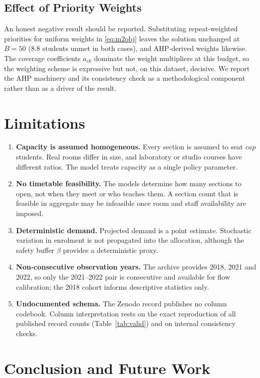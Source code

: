 \documentclass[conference]{IEEEtran}
\begin{document}
\subsection{Effect of Priority Weights}

An honest negative result should be reported. Substituting repeat-weighted priorities for
uniform weights in \eqref{eq:m2obj} leaves the solution unchanged at $B = 50$
(8.8 students unmet in both cases), and AHP-derived weights likewise. The coverage
coefficients $a_{ck}$ dominate the weight multipliers at this budget, so the weighting
scheme is expressive but not, on this dataset, decisive. We report the AHP machinery and
its consistency check as a methodological component rather than as a driver of the
result.

\section{Limitations}

\begin{enumerate}
\item \textbf{Capacity is assumed homogeneous.} Every section is assumed to seat $cap$
      students. Real rooms differ in size, and laboratory or studio courses have
      different ratios. The model treats capacity as a single policy parameter.
\item \textbf{No timetable feasibility.} The models determine how many sections to open,
      not when they meet or who teaches them. A section count that is feasible in
      aggregate may be infeasible once room and staff availability are imposed.
\item \textbf{Deterministic demand.} Projected demand is a point estimate. Stochastic
      variation in enrolment is not propagated into the allocation, although the safety
      buffer $\beta$ provides a deterministic proxy.
\item \textbf{Non-consecutive observation years.} The archive provides 2018, 2021 and
      2022, so only the 2021--2022 pair is consecutive and available for flow
      calibration; the 2018 cohort informs descriptive statistics only.
\item \textbf{Undocumented schema.} The Zenodo record publishes no column codebook.
      Column interpretation rests on the exact reproduction of all published record
      counts (Table~\ref{tab:valid}) and on internal consistency checks.
\end{enumerate}

\section{Conclusion and Future Work}
\end{document}
